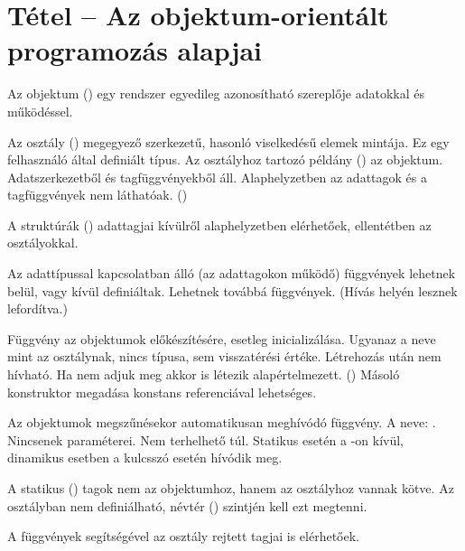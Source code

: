\documentclass[main.tex]{subfiles}
\begin{document}
  \section{Tétel – Az objektum-orientált programozás alapjai} %

  Az objektum () egy rendszer egyedileg
  azonosítható szereplője adatokkal és működéssel.
  

  Az osztály () megegyező szerkezetű,
  hasonló viselkedésű elemek mintája.
  Ez egy felhasználó által definiált típus.
  Az osztályhoz tartozó példány () az objektum.
  Adatszerkezetből és tagfüggvényekből áll.
  Alaphelyzetben az adattagok és a tagfüggvények
  nem láthatóak. ()


  A struktúrák () adattagjai kívülről
  alaphelyzetben elérhetőek, ellentétben az osztályokkal.


  Az adattípussal kapcsolatban álló (az adattagokon működő)
  függvények lehetnek belül, vagy kívül definiáltak.
  Lehetnek továbbá  függvények.
  (Hívás helyén lesznek lefordítva.)


  Függvény az objektumok előkészítésére, esetleg inicializálása.
  Ugyanaz a neve mint az osztálynak, nincs típusa,
  sem visszatérési értéke. Létrehozás után nem hívható.
  Ha nem adjuk meg akkor is létezik alapértelmezett. ()
  Másoló konstruktor megadása konstans referenciával lehetséges.


  Az objektumok megszűnésekor automatikusan meghívódó függvény.
  A neve: . Nincsenek paraméterei.
  Nem terhelhető túl. Statikus  esetén a
  -on kívül, dinamikus esetben a 
  kulcsszó esetén hívódik meg.


  A statikus () tagok nem az objektumhoz,
  hanem az osztályhoz vannak kötve. Az osztályban nem definiálható,
  névtér () szintjén kell ezt megtenni.


  A  függvények segítségével az osztály rejtett tagjai
  is elérhetőek.
\end{document}
